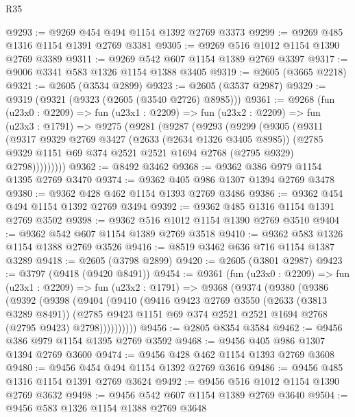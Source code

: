 \begin{lexlean}{R35}
\begin{coremodule}
@9293 := @9269 @454 @494 @1154 @1392 @2769 @3373
@9299 := @9269 @485 @1316 @1154 @1391 @2769 @3381
@9305 := @9269 @516 @1012 @1154 @1390 @2769 @3389
@9311 := @9269 @542 @607 @1154 @1389 @2769 @3397
@9317 := @9006 @3341 @583 @1326 @1154 @1388 @3405
@9319 := @2605 (@3665 @2218)
@9321 := @2605 (@3534 @2899)
@9323 := @2605 (@3537 @2987)
@9329 := @9319 (@9321 (@9323 (@2605 (@3540 @2726) @8985)))
@9361 := @9268
    (fun (u23x0 : @2209) =>
    fun (u23x1 : @2209) =>
    fun (u23x2 : @2209) =>
    fun (u23x3 : @1791) =>
    @9275
      (@9281
        (@9287
          (@9293
            (@9299
              (@9305
                (@9311
                  (@9317
                    @9329
                    @2769
                    @3427
                    (@2633 (@2634 @1326 @3405 @8985))
                    (@2785 @9329 @1151 @69 @374 @2521 @2521 @1694 @2768 (@2795 @9329) @2798)))))))))
@9362 := @8492 @3462
@9368 := @9362 @386 @979 @1154 @1395 @2769 @3470
@9374 := @9362 @405 @986 @1307 @1394 @2769 @3478
@9380 := @9362 @428 @462 @1154 @1393 @2769 @3486
@9386 := @9362 @454 @494 @1154 @1392 @2769 @3494
@9392 := @9362 @485 @1316 @1154 @1391 @2769 @3502
@9398 := @9362 @516 @1012 @1154 @1390 @2769 @3510
@9404 := @9362 @542 @607 @1154 @1389 @2769 @3518
@9410 := @9362 @583 @1326 @1154 @1388 @2769 @3526
@9416 := @8519 @3462 @636 @716 @1154 @1387 @3289
@9418 := @2605 (@3798 @2899)
@9420 := @2605 (@3801 @2987)
@9423 := @3797 (@9418 (@9420 @8491))
@9454 := @9361
    (fun (u23x0 : @2209) =>
    fun (u23x1 : @2209) =>
    fun (u23x2 : @1791) =>
    @9368
      (@9374
        (@9380
          (@9386
            (@9392
              (@9398
                (@9404
                  (@9410
                    (@9416
                      @9423
                      @2769
                      @3550
                      (@2633 (@3813 @3289 @8491))
                      (@2785
                        @9423
                        @1151
                        @69
                        @374
                        @2521
                        @2521
                        @1694
                        @2768
                        (@2795 @9423)
                        @2798))))))))))
@9456 := @2805 @8354 @3584
@9462 := @9456 @386 @979 @1154 @1395 @2769 @3592
@9468 := @9456 @405 @986 @1307 @1394 @2769 @3600
@9474 := @9456 @428 @462 @1154 @1393 @2769 @3608
@9480 := @9456 @454 @494 @1154 @1392 @2769 @3616
@9486 := @9456 @485 @1316 @1154 @1391 @2769 @3624
@9492 := @9456 @516 @1012 @1154 @1390 @2769 @3632
@9498 := @9456 @542 @607 @1154 @1389 @2769 @3640
@9504 := @9456 @583 @1326 @1154 @1388 @2769 @3648

\end{coremodule}
\end{lexlean}
